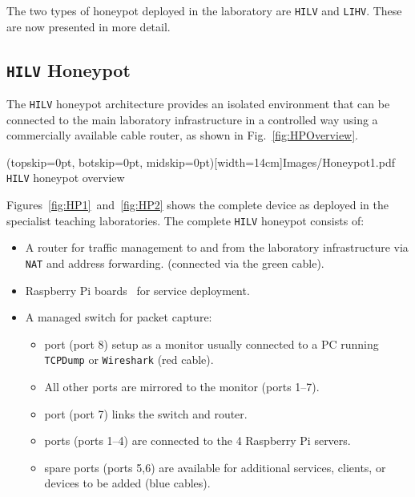 \documentclass{ieeeaccess}
\begin{document}
The two types of honeypot deployed in the laboratory are
\texttt{HILV} and \texttt{LIHV}. These are now presented in more detail.

\subsection{\texttt{HILV} Honeypot}

The \texttt{HILV} honeypot architecture provides an isolated environment that
can be connected to the main laboratory infrastructure in a controlled way
using a commercially available cable router, as shown in
Fig.~\ref{fig:HPOverview}.

\Figure[t!](topskip=0pt, botskip=0pt, midskip=0pt)[width=14cm]{Images/Honeypot1.pdf}
{\texttt{HILV} honeypot overview\label{fig:HPOverview}}


Figures~\ref{fig:HP1}~and~\ref{fig:HP2} shows the complete device as deployed
in the specialist teaching laboratories. The complete \texttt{HILV} honeypot
consists of:

\begin{itemize}
    \item \noindent A router for traffic management to and from the laboratory
      infrastructure via \texttt{NAT} and address forwarding. (connected via the
      green cable). 
    \item {} Raspberry Pi boards~\cite{RASP:17} for service deployment.
    \item \noindent A managed switch for packet capture:
    \begin{itemize}
        \item {} port (port 8) setup as a monitor usually connected to
          a PC running \texttt{TCPDump} or \texttt{Wireshark} (red cable).
        \item \noindent All other ports are mirrored to the monitor (ports
          1--7).
        \item {} port (port 7) links the switch and router.
        \item {} ports (ports 1--4) are connected to the 4 Raspberry Pi 
        servers.
        \item {} spare ports (ports 5,6) are available for additional
          services, clients, or devices to be added (blue cables).
    \end{itemize}
\end{itemize}
\end{document}
